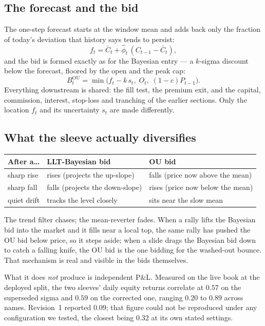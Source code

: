 \documentclass[11pt]{article}
\begin{document}
\subsection{The forecast and the bid}
The one-step forecast starts at the window mean and adds back only the fraction of today's
deviation that history says tends to persist:
\begin{equation}
f_t=\bar C_t+\hat\phi_t\,(C_{t-1}-\bar C_t),
\end{equation}
and the bid is formed exactly as for the Bayesian entry --- a $k$-sigma discount below the
forecast, floored by the open and the peak cap:
\begin{equation}
B_t^{\text{OU}}=\min\bigl(f_t-k\,s_t,\;O_t,\;(1-c)P_{t-1}\bigr).
\end{equation}
Everything downstream is shared: the fill test, the premium exit, and the capital, commission,
interest, stop-loss and tranching of the earlier sections. Only the location $f_t$ and its
uncertainty $s_t$ are made differently.

\subsection{What the sleeve actually diversifies}\label{sec:hedge}

\begin{table}[H]\centering\small
\begin{tabular}{lll}
\toprule
\textbf{After a\dots} & \textbf{LLT-Bayesian bid} & \textbf{OU bid}\\
\midrule
sharp rise & rises (projects the up-slope) & falls (price now above the mean)\\
sharp fall & falls (projects the down-slope) & rises (price now below the mean)\\
quiet drift & tracks the level closely & sits near the slow mean\\
\bottomrule
\end{tabular}
\end{table}
The trend filter chases; the mean-reverter fades. When a rally lifts the Bayesian bid into the
market and it fills near a local top, the same rally has pushed the OU bid below price, so it
steps aside; when a slide drags the Bayesian bid down to catch a falling knife, the OU bid is the
one bidding for the washed-out bounce. That mechanism is real and visible in the bids themselves.

What it does \emph{not} produce is independent P\&L. Measured on the live book at the deployed
split, the two sleeves' daily equity returns correlate at $\mathbf{0.57}$ on the superseded sigma
and $0.59$ on the corrected one, ranging $0.20$ to $0.89$ across names. Revision~1 reported
$0.09$; that figure could not be reproduced under any configuration we tested, the closest being
$0.32$ at its own stated settings.
\end{document}
